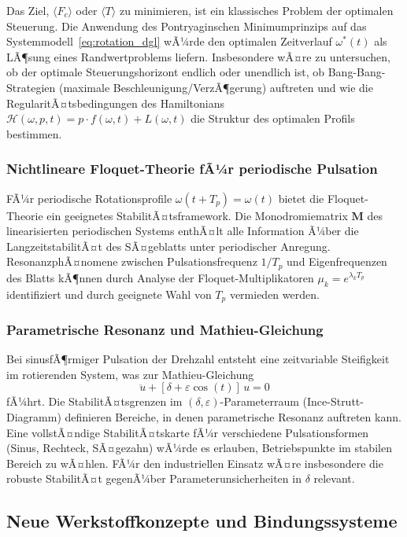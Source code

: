 ﻿\documentclass[a4paper,12pt]{article}
\theoremstyle{definition}
\begin{document}
Das Ziel, $\langle F_c \rangle$ oder $\langle T \rangle$ zu minimieren, ist ein
klassisches Problem der optimalen Steuerung. Die Anwendung des Pontryaginschen
Minimumprinzips auf das Systemmodell~\eqref{eq:rotation_dgl} wÃ¼rde den optimalen
Zeitverlauf $\omega^*(t)$ als LÃ¶sung eines Randwertproblems liefern. Insbesondere
wÃ¤re zu untersuchen, ob der optimale Steuerungshorizont endlich oder unendlich ist,
ob Bang-Bang-Strategien (maximale Beschleunigung/VerzÃ¶gerung) auftreten und wie
die RegularitÃ¤tsbedingungen des Hamiltonians $\mathcal{H}(\omega, p, t) = p \cdot f(\omega,t) + L(\omega,t)$
die Struktur des optimalen Profils bestimmen.

\subsubsection{Nichtlineare Floquet-Theorie fÃ¼r periodische Pulsation}

FÃ¼r periodische Rotationsprofile $\omega(t+T_p) = \omega(t)$ bietet die Floquet-Theorie
ein geeignetes StabilitÃ¤tsframework. Die Monodromiematrix $\mathbf{M}$ des linearisierten
periodischen Systems enthÃ¤lt alle Information Ã¼ber die LangzeitstabilitÃ¤t des SÃ¤geblatts
unter periodischer Anregung. ResonanzphÃ¤nomene zwischen Pulsationsfrequenz $1/T_p$ und
Eigenfrequenzen des Blatts kÃ¶nnen durch Analyse der Floquet-Multiplikatoren
$\mu_k = e^{\lambda_k T_p}$ identifiziert und durch geeignete Wahl von $T_p$ vermieden werden.

\subsubsection{Parametrische Resonanz und Mathieu-Gleichung}

Bei sinusfÃ¶rmiger Pulsation der Drehzahl entsteht eine zeitvariable Steifigkeit
im rotierenden System, was zur Mathieu-Gleichung
\[
\ddot{u} + [\delta + \varepsilon\cos(t)]\,u = 0
\]
fÃ¼hrt. Die StabilitÃ¤tsgrenzen im $(\delta, \varepsilon)$-Parameterraum (Ince-Strutt-Diagramm)
definieren Bereiche, in denen parametrische Resonanz auftreten kann.
Eine vollstÃ¤ndige StabilitÃ¤tskarte fÃ¼r verschiedene Pulsationsformen (Sinus, Rechteck, SÃ¤gezahn)
wÃ¼rde es erlauben, Betriebspunkte im stabilen Bereich zu wÃ¤hlen. FÃ¼r den industriellen Einsatz
wÃ¤re insbesondere die robuste StabilitÃ¤t gegenÃ¼ber Parameterunsicherheiten in $\delta$ relevant.

\subsection{Neue Werkstoffkonzepte und Bindungssysteme}
\end{document}
